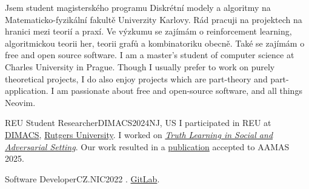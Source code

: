 \begin{intro}
	\lng
	{
		Jsem student magisterského programu Diskrétní modely a algoritmy na Matematicko-fyzikální fakultě Univerzity Karlovy.
		Rád pracuji na projektech na hranici mezi teorií a praxí.
		Ve výzkumu se zajímám o reinforcement learning, algoritmickou teorii her, teorii grafů a kombinatoriku obecně.
		Také se zajímám o free and open source software.
	}{
		I am a master's student of computer science at Charles University in Prague.
		Though I usually prefer to work on purely theoretical projects, I do also enjoy projects which are part-theory and part-application.
		I am passionate about free and open-source software, and all things Neovim.
	}
\end{intro}


\begin{multicols}{2}
	\raggedcolumns


\begin{work}{REU Student Researcher}{DIMACS}{2024}{NJ, US}
	{I participated in REU at} \href{http://dmac.rutgers.edu/}{DIMACS}, \href{https://www.rutgers.edu/}{Rutgers University}.
	{I worked on} \emph{\href{https://reu.dimacs.rutgers.edu/~fu37/}{Truth Learning in Social and Adversarial Setting}}.
	{Our work resulted in a \href{https://furadnik.github.io/projects/2025_truth_learning}{publication} accepted to AAMAS 2025.}
\end{work}

\worksplit

\begin{work}{Software Developer}{CZ.NIC}{2022}{\Praha{}}
	.
	 \href{https://gitlab.nic.cz/fred/eppic}{GitLab}.
\end{work}




\end{multicols}
